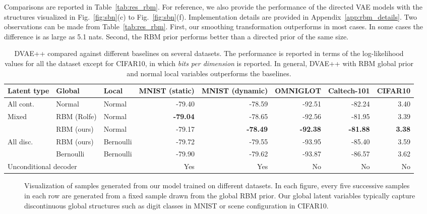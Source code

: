 \documentclass{article}
\begin{document}
Comparisons are reported in Table~\ref{tab:res_rbm}.
For reference, we also provide the performance of the directed VAE models with 
the structures visualized in Fig.~\ref{fig:sbn}(c) to Fig.~\ref{fig:sbn}(f).
Implementation details are provided in Appendix~\ref{app:rbm_details}. 
Two observations can be made from Table~\ref{tab:res_rbm}. First, our smoothing transformation 
outperforms \cite{rolfe2016discrete} in most cases. In some cases the difference is as 
large as 5.1 nats. Second, the RBM prior performs better than a directed prior of the same size. 



\begin{table*}
\caption{DVAE++ compared against different baselines on several datasets. The performance is reported in terms of the log-likelihood values for all the dataset except for CIFAR10, in which \textit{bits per dimension} is reported. In general, DVAE++ with RBM global prior and normal local variables outperforms the baselines.} \label{tab:res_dvae}
\small
\centering
\begin{tabular}{l l l r r r r r}
Latent type & Global & Local  & MNIST (static) & MNIST (dynamic) & OMNIGLOT & Caltech-101 & CIFAR10 \\
\hline
All cont. & Normal & Normal & -79.40 & -78.59 & -92.51 & -82.24 & 3.40 \\
\hline
\multirow{2}{*}{Mixed} & RBM (Rolfe) & Normal    & \textbf{-79.04} & -78.65 & -92.56 & -81.95 & 3.39 \\
& RBM (ours)  & Normal    & -79.17 & \textbf{-78.49} & \textbf{-92.38} & \textbf{-81.88} & \textbf{3.38} \\
\hline
\multirow{2}{*}{All disc.} & RBM (ours)  & Bernoulli & -79.72 & -79.55 & -93.95 & -85.40 & 3.59 \\
& Bernoulli   & Bernoulli & -79.90 & -79.62 & -93.87 & -86.57 & 3.62 \\
\hline
\hline
\multicolumn{3}{l}{Unconditional decoder} & Yes & Yes & No & No & No \\
\end{tabular}
\end{table*}

\begin{figure*}
 \centering
    \hspace{0.1cm}
    \hspace{0.1cm}
    \hspace{0.1cm}
    \hspace{0.1cm}
  \caption{Visualization of samples generated from our model trained on different datasets. In each figure,
  every five successive samples in each row are generated from a fixed sample drawn from the global RBM prior. Our global latent variables typically capture discontinuous global structures such as digit
  classes in MNIST or scene configuration in CIFAR10.}
  \label{fig:vis}
\end{figure*}
\end{document}
